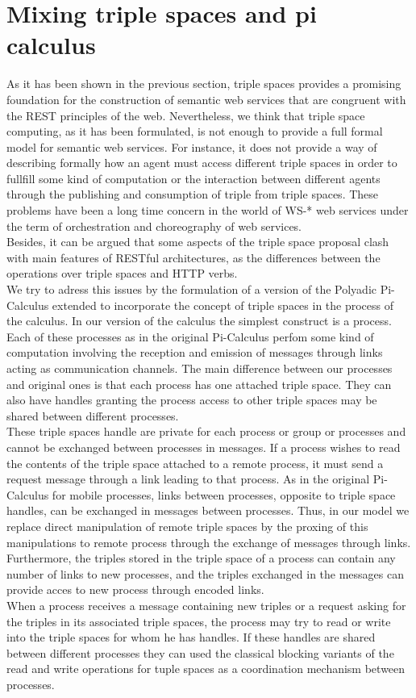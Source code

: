 \section{Mixing triple spaces and pi calculus}
As it has been shown in the previous section, triple spaces provides a promising foundation for the construction of
semantic web services that are congruent with the REST principles of the web. 
Nevertheless, we think that triple space computing, as it has been formulated, is not enough to provide a full formal
model for semantic web services. For instance, it does not provide a way of describing formally how an agent must access different
triple spaces in order to fullfill some kind of computation or the interaction between different agents through the
publishing and consumption of triple from triple spaces. These problems have been a long time concern in the world of WS-* web services under the term of orchestration and
choreography of web services.\\
Besides, it can be argued that some aspects of the triple space proposal clash with main features of RESTful architectures, as the differences between the
operations over triple spaces and HTTP verbs.\\

We try to adress this issues by the formulation of a version of the Polyadic Pi-Calculus
extended to incorporate the concept of triple spaces in the process of the calculus.  
In our version of the calculus the simplest construct is a process. Each of these processes as in the original
Pi-Calculus perfom some kind of computation involving the reception and emission of messages through links acting as communication channels. The main
difference between our processes and original ones is that each process has one attached triple space. They can also
have handles granting the process access to other triple spaces may be shared between different processes.\\ These
triple spaces handle are private for each process or group or processes and cannot be exchanged between processes in
messages. If a process wishes to read the contents of the triple space attached to a remote process, it must send a
request message through a link leading to that process. As in the original Pi-Calculus for mobile processes, links
between processes, opposite to triple space handles, can be exchanged in messages between processes. Thus, in our model
we replace direct manipulation of remote triple spaces by the proxing of this manipulations to remote process through
the exchange of messages through links. Furthermore, the
triples stored in the triple space of a process can contain any number of links to new processes, and the triples
exchanged in the messages can provide acces to new process through encoded links.\\
When a process receives a message containing new triples or a request asking for the triples in its associated triple
spaces, the process may try to read or write into the triple spaces for whom he has handles. If these handles are shared
between different processes they can used the classical blocking variants of the read and write operations for tuple
spaces as a coordination mechanism between processes.\\

